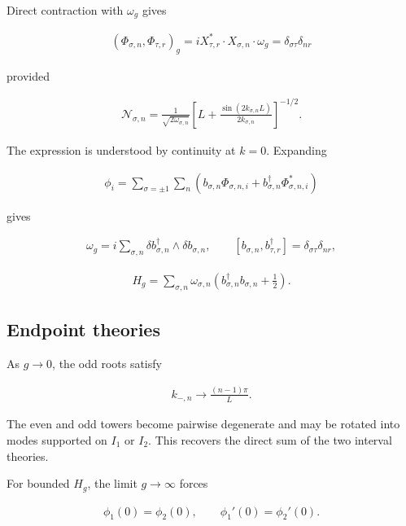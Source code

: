 Direct contraction with $\omega_g$ gives

\begin{align}
(\Phi_{\sigma,n},\Phi_{\tau,r})_g
=iX_{\tau,r}^*\mathbin{\cdot}X_{\sigma,n}\mathbin{\cdot}\omega_g
=\delta_{\sigma\tau}\delta_{nr}
\end{align}

provided

\begin{align}
\mathcal N_{\sigma,n}
=\frac{1}{\sqrt{2\omega_{\sigma,n}}}
\left[
L+\frac{\sin(2k_{\sigma,n}L)}{2k_{\sigma,n}}
\right]^{-1/2}.
\end{align}

The expression is understood by continuity at $k=0$. Expanding

\begin{align}
\phi_i
=\sum_{\sigma=\pm1}\sum_n
\left(
b_{\sigma,n}\Phi_{\sigma,n,i}
+b_{\sigma,n}^\dagger\Phi_{\sigma,n,i}^*
\right)
\end{align}

gives

\begin{align}
\omega_g=i\sum_{\sigma,n}\delta b_{\sigma,n}^\dagger\wedge\delta b_{\sigma,n},
\qquad
[b_{\sigma,n},b_{\tau,r}^\dagger]
=\delta_{\sigma\tau}\delta_{nr},
\end{align}

\begin{align}
H_g=\sum_{\sigma,n}\omega_{\sigma,n}
\left(b_{\sigma,n}^\dagger b_{\sigma,n}+\frac12\right).
\end{align}

\subsection{Endpoint theories}\label{subsec:interval-endpoints}

As $g\to0$, the odd roots satisfy

\begin{align}
k_{-,n}\longrightarrow\frac{(n-1)\pi}{L}.
\end{align}

The even and odd towers become pairwise degenerate and may be rotated into modes supported on $I_1$ or $I_2$. This recovers the direct sum of the two interval theories.

For bounded $H_g$, the limit $g\to\infty$ forces

\begin{align}
\phi_1(0)=\phi_2(0),
\qquad
\phi_1'(0)=\phi_2'(0).
\end{align}


